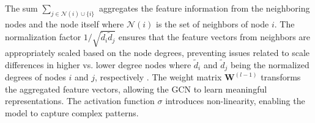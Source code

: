 \documentclass[aps, prd, showpacs, floatfix, superscriptaddress, twocolumn, nofootinbib, preprintnumbers, longbibliography]{revtex4-2}
\begin{document}
The sum $\sum_{j \in \mathcal{N}(i) \cup \{i\}}$ aggregates the feature information from the neighboring nodes and the node itself where $\mathcal{N}(i)$ is the set of neighbors of node $i$. The normalization factor $1/\sqrt{\tilde{d}_{i} \tilde{d}_{j}}$ ensures that the feature vectors from neighbors are appropriately scaled based on the node degrees, preventing issues related to scale differences in higher vs. lower degree nodes where $\tilde{d}_{i}$ and $\tilde{d}_{j}$ being the normalized degrees of nodes $i$ and $j$, respectively \cite{GCNchaupham}. The weight matrix $\mathbf{W}^{(l-1)}$ transforms the aggregated feature vectors, allowing the GCN to learn meaningful representations. The activation function $\sigma$ introduces non-linearity, enabling the model to capture complex patterns. 
\end{document}
